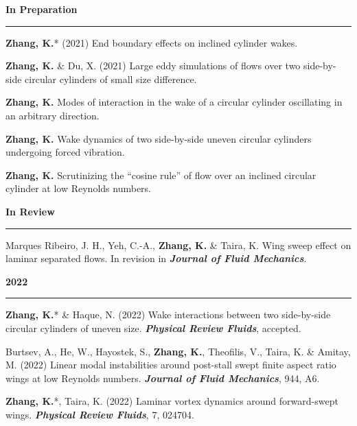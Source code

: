 \documentclass[10pt]{article}
\begin{document}
{\small
\begin{etaremune}

 \item []{\color{gray}  {\bf  In Preparation \rule{14cm}{0.2mm}} 
 

  
  \item \textbf{Zhang, K.}* (2021)  End boundary effects on inclined cylinder wakes.
  
  \item \textbf{Zhang, K.} \& Du, X. (2021) Large eddy simulations of flows over two side-by-side circular cylinders of small size difference.
  
  \item \textbf{Zhang, K.}  Modes of interaction in the wake of a circular cylinder oscillating in an arbitrary direction.
  
  \item \textbf{Zhang, K.}  Wake dynamics of two side-by-side uneven circular cylinders undergoing forced vibration.
  
  \item \textbf{Zhang, K.}  Scrutinizing the ``cosine rule'' of flow over an inclined circular cylinder at low Reynolds numbers.
  
}
 \item [] {\bf \color{Blue} In Review \rule{14cm}{0.2mm}} 

 \item Marques Ribeiro, J. H., Yeh, C.-A., \textbf{Zhang, K.} \& Taira, K. Wing sweep effect on laminar separated flows. In revision in \textit{\textbf{Journal of Fluid Mechanics}}.

 
  
\item [] {\bf \color{Blue} 2022 \rule{14.8cm}{0.2mm}}

 \item \textbf{Zhang, K.}* \& Haque, N. (2022) Wake interactions between two side-by-side circular cylinders of uneven size.  \textit{\textbf{Physical Review Fluids}}, accepted.


  \item Burtsev, A., He, W., Hayostek, S., \textbf{Zhang, K.}, Theofilis, V., Taira, K. \& Amitay, M. (2022) Linear modal instabilities around post-stall swept finite aspect ratio wings at low Reynolds numbers. \textit{\textbf{Journal of Fluid Mechanics}}, 944, A6.

  \item \textbf{Zhang, K.}*, Taira, K. (2022) Laminar vortex dynamics around forward-swept wings.  \textit{\textbf{Physical Review Fluids}}, 7, 024704.


\end{etaremune}}
\end{document}
